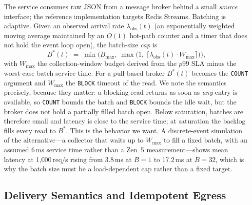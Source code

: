 \documentclass[conference]{IEEEtran}
\begin{document}
The service consumes raw JSON from a message broker behind a small \emph{source} interface; the reference implementation targets Redis Streams. Batching is adaptive. Given an observed arrival rate $\lambda_{\text{obs}}(t)$ (an exponentially weighted moving average maintained by an $O(1)$ hot-path counter and a timer that does not hold the event loop open), the batch-size \emph{cap} is
\begin{equation}
B^{*}(t) \;=\; \min\!\Big(B_{\max},\ \max\big(1,\ \lceil \lambda_{\text{obs}}(t)\cdot W_{\max}\rceil\big)\Big),
\label{eq:batch}
\end{equation}
with $W_{\max}$ the collection-window budget derived from the $p99$ SLA minus the worst-case batch service time. For a pull-based broker $B^{*}(t)$ becomes the \texttt{COUNT} argument and $W_{\max}$ the \texttt{BLOCK} timeout of the read. We note the semantics precisely, because they matter: a blocking read returns as soon as \emph{any} entry is available, so \texttt{COUNT} bounds the batch and \texttt{BLOCK} bounds the idle wait, but the broker does not hold a partially filled batch open. Below saturation, batches are therefore small and latency is close to the service time; at saturation the backlog fills every read to $B^{*}$. This is the behavior we want. A discrete-event simulation of the alternative---a collector that waits up to $W_{\max}$ to fill a fixed batch, with an assumed 6\,ms service time rather than a Zen~5 measurement---shows mean latency at 1{,}000\,req/s rising from 3.8\,ms at $B{=}1$ to 17.2\,ms at $B{=}32$, which is why the batch size must be a load-dependent cap rather than a fixed target.

\subsection{Delivery Semantics and Idempotent Egress}
\end{document}

